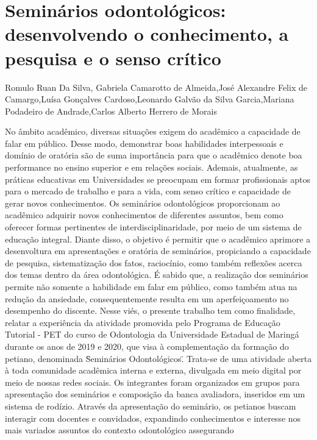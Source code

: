 

\section{Seminários odontológicos: desenvolvendo o conhecimento, a pesquisa e o senso crítico}

Romulo Ruan Da Silva, Gabriela Camarotto de Almeida,José Alexandre Felix de Camargo,Luísa Gonçalves Cardoso,Leonardo Galvão da Silva Garcia,Mariana Podadeiro de Andrade,Carlos Alberto Herrero de Morais

No âmbito acadêmico, diversas situações exigem do acadêmico a capacidade de falar em
público. Desse modo, demonstrar boas habilidades interpessoais e domínio de oratória são de
suma importância para que o acadêmico denote boa performance no ensino superior e em
relações sociais. Ademais, atualmente, as práticas educativas em Universidades se preocupam
em formar profissionais aptos para o mercado de trabalho e para a vida, com senso crítico e
capacidade de gerar novos conhecimentos. Os seminários odontológicos proporcionam ao
acadêmico adquirir novos conhecimentos de diferentes assuntos, bem como oferecer formas
pertinentes de interdisciplinaridade, por meio de um sistema de educação integral. Diante disso,
o objetivo é permitir que o acadêmico aprimore a desenvoltura em apresentações e oratória de
seminários, propiciando a capacidade de pesquisa, sistematização dos fatos, raciocínio, como
também reflexões acerca dos temas dentro da área odontológica. É sabido que, a realização dos
seminários permite não somente a habilidade em falar em público, como também atua na
redução da ansiedade, consequentemente resulta em um aperfeiçoamento no desempenho do
discente. Nesse viés, o presente trabalho tem como finalidade, relatar a experiência da atividade
promovida pelo Programa de Educação Tutorial - PET do curso de Odontologia da Universidade
Estadual de Maringá durante os anos de 2019 e 2020, que visa à complementação da formação
do petiano, denominada \"Seminários Odontológicos\". Trata-se de uma atividade aberta à toda
comunidade acadêmica interna e externa, divulgada em meio digital por meio de nossas redes
sociais. Os integrantes foram organizados em grupos para apresentação dos seminários e
composição da banca avaliadora, inseridos em um sistema de rodízio. Através da apresentação
do seminário, os petianos buscam interagir com docentes e convidados, expandindo
conhecimentos e interesse nos mais variados assuntos do contexto odontológico assegurando
